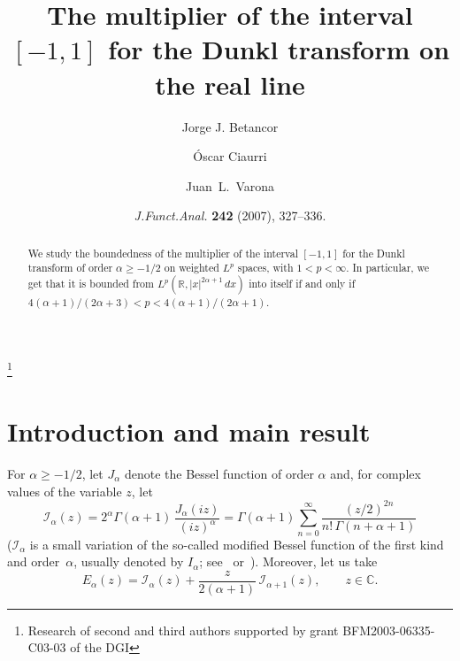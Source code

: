 \documentclass[a4paper]{amsart}
\date{\textit{J.\@ Funct.\@ Anal.\@} \textbf{242} (2007), 327--336.}
\theoremstyle{plain}
\theoremstyle{remark}
\newcommand{\C}{\mathbb{C}}
\begin{document}
\title[The multiplier of {$[-1,1]$} for the Dunkl transform]{The multiplier of the interval $[-1,1]$ for the Dunkl transform on the real line}

\author[J. J. Betancor]{Jorge J. Betancor}
\address{Departamento de An\'alisis Matem\'atico,
Universidad de La Laguna,
38271 La Laguna (Tenerife), Islas Canarias, Spain}

\author[\'O. Ciaurri]{\'Oscar Ciaurri}
\address{Departamento de Matem\'aticas y Computaci\'on,
Universidad de La Rioja, Edificio J.~L.~Vives,
Calle Luis de Ulloa s/n, 26004 Logro\~no, Spain}

\author[J. L. Varona]{Juan~L.~Varona}
\address{Departamento de Matem\'aticas y Computaci\'on,
Universidad de La Rioja, Edificio J.~L.~Vives,
Calle Luis de Ulloa s/n, 26004 Logro\~no, Spain}
\thanks{Research of second and third authors supported by grant BFM2003-06335-C03-03 of the DGI}



\begin{abstract}
We study the boundedness of the multiplier of the interval $[-1,1]$ for the Dunkl transform of order $\alpha \ge -1/2$ on weighted $L^p$ spaces, with $1<p<\infty$. In particular, we get that it is bounded from $L^p(\mathbb{R},|x|^{2\alpha+1}\,dx)$ into itself if and only if $4(\alpha+1)/(2\alpha+3) < p < 4(\alpha+1)/(2\alpha+1)$.
\end{abstract}

\maketitle

\section{Introduction and main result}

For $\alpha \ge -1/2$, let $J_\alpha$ denote the Bessel function of order $\alpha$ and,
for complex values of the variable $z$, let
$$
  \mathcal{I}_\alpha(z)
  = 2^\alpha \Gamma(\alpha+1)\, \frac{J_\alpha(iz)}{(iz)^\alpha}
  = \Gamma(\alpha+1) \sum_{n=0}^\infty \frac{(z/2)^{2n}}{n!\,\Gamma(n+\alpha+1)}
$$
($\mathcal{I}_\alpha$ is a small variation of the so-called modified Bessel function of the first kind and order~$\alpha$, usually denoted by $I_\alpha$; see~\cite{Le} or~\cite{Wat}).
Moreover, let us take
$$
  E_\alpha(z) = \mathcal{I}_\alpha(z) + \frac{z}{2(\alpha+1)}\,
  \mathcal{I}_{\alpha+1}(z),
  \qquad z \in \C.
$$
\end{document}
